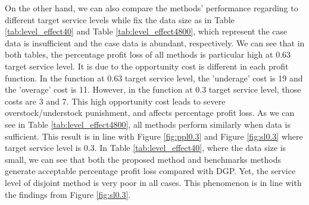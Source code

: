 \documentclass{article}
\begin{document}
\begin{table}[ht]
\caption{Size effect at 0.3 target service level}
\label{tab:size_effect0.3}
\centering {} 
\end{table}

On the other hand, we can also compare the methods' performance regarding to different target service levels while fix the data size as in Table \ref{tab:level_effect40} and Table \ref{tab:level_effect4800}, which represent the case data is insufficient and the case data is abundant, respectively. We can see that in both tables, the percentage profit loss of all methods is particular high at 0.63 target service level. It is due to the opportunity cost is different in each profit function. In the function at 0.63 target service level, the 'underage' cost is 19 and the 'overage' cost is 11. However, in the function at 0.3 target service level, those costs are 3 and 7. This high opportunity cost leads to severe overstock/understock punishment, and affects percentage profit loss. As we can see in Table \ref{tab:level_effect4800}, all methods perform similarly when data is sufficient. This result is in line with Figure \ref{fig:ppl0.3} and Figure \ref{fig:sl0.3} where target service level is 0.3. In Table \ref{tab:level_effect40}, where the data size is small, we can see that both the proposed method and benchmarks methods generate acceptable percentage profit loss compared with DGP. Yet, the service level of disjoint method is very poor in all cases. This phenomenon is in line with the findings from Figure \ref{fig:sl0.3}.
\end{document}
